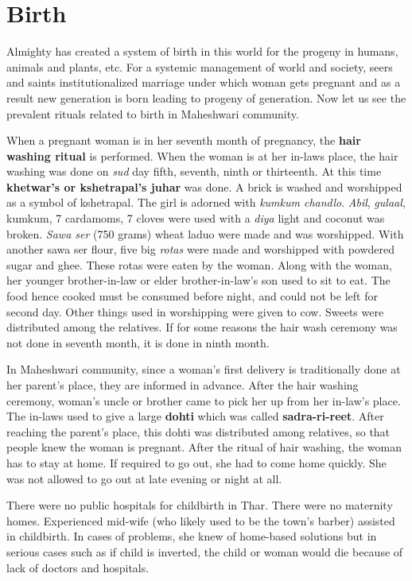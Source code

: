 \section{Birth}
Almighty has created a system of birth in this world for the progeny in humans,
animals and plants, etc. For a systemic management of world and society, seers
and saints institutionalized marriage under which woman gets pregnant and as a
result new generation is born leading to progeny of generation. Now let us see
the prevalent rituals related to birth in Maheshwari community.

When a pregnant woman is in her seventh month of pregnancy, the \textbf{hair
washing ritual} is performed.  When the woman is at her in-laws place, the hair
washing was done on \textit{sud} day fifth, seventh, ninth or thirteenth.  At
this time \textbf{khetwar's or kshetrapal's juhar} was done. A brick is washed
and worshipped as a symbol of kshetrapal.  The girl is adorned with
\textit{kumkum chandlo}. \textit{Abil}, \textit{gulaal}, kumkum, 7 cardamoms, 7
cloves were used with a \textit{diya} light and coconut was broken.
\textit{Sawa ser} (750 grams) wheat laduo were made and was worshipped. With
another sawa ser flour, five big \textit{rotas} were made and worshipped with
powdered sugar and ghee. These rotas were eaten by the woman. Along with the
woman, her younger brother-in-law or elder brother-in-law's son used to sit to
eat. The food hence cooked must be consumed before night, and could not be left
for second day. Other things used in worshipping were given to cow. Sweets were
distributed among the relatives. If for some reasons the hair wash ceremony was
not done in seventh month, it is done in ninth month.

In Maheshwari community, since a woman's first delivery is traditionally done
at her parent's place, they are informed in advance. After the hair washing
ceremony, woman's uncle or brother came to pick her up from her in-law's place.
The in-laws used to give a large \textbf{dohti} which was called
\textbf{sadra-ri-reet}. After reaching the parent's place, this dohti was
distributed among relatives, so that people knew the woman is pregnant. After
the ritual of hair washing, the woman has to stay at home. If required to go
out, she had to come home quickly. She was not allowed to go out at late
evening or night at all.

There were no public hospitals for childbirth in Thar. There were no maternity
homes. Experienced mid-wife (who likely used to be the town's barber) assisted in
childbirth. In cases of problems, she knew of home-based solutions but in
serious cases such as if child is inverted, the child or woman would die
because of lack of doctors and hospitals.


